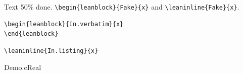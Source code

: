 Text 50\% done. \verb|\begin{leanblock}{Fake}{x}| and \verb*+\leaninline{Fake}{x}+.
\begin{verbatim}
\begin{leanblock}{In.verbatim}{x}
\end{leanblock}
\end{verbatim}
\begin{lstlisting}
\leaninline{In.listing}{x}
\end{lstlisting}
\begin{leanblock}{Demo.c}{Real}%
\end{leanblock}
